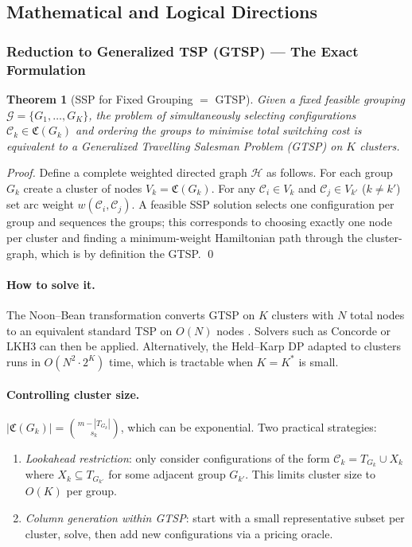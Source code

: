 \documentclass[11pt,a4paper]{article}
\theoremstyle{plain}
\newtheorem{theorem}{Theorem}[section]
\theoremstyle{definition}
\newcommand{\Cconf}{\mathfrak{C}}   %
\newcommand{\calG}{\mathcal{G}}     %
\newcommand{\Kstar}{K^{*}}          %
\newcommand{\sswitch}[2]{w(#1,#2)}  %
\begin{document}
\subsection{Mathematical and Logical Directions}

\subsubsection{Reduction to Generalized TSP (GTSP) --- The Exact Formulation}
\label{sec:GTSP}

\begin{thmbox}
\begin{theorem}[SSP for Fixed Grouping $=$ GTSP]
\label{thm:GTSP}
Given a fixed feasible grouping $\calG = \{G_1,\ldots,G_K\}$, the problem of
simultaneously selecting configurations $\mathcal{C}_k \in \Cconf(G_k)$ and
ordering the groups to minimise total switching cost is equivalent to a
Generalized Travelling Salesman Problem (GTSP) on $K$ clusters.
\end{theorem}
\end{thmbox}

\begin{proof}
Define a complete weighted directed graph $\mathcal{H}$ as follows.
For each group $G_k$ create a cluster of nodes $V_k = \Cconf(G_k)$.
For any $\mathcal{C}_i \in V_k$ and $\mathcal{C}_j \in V_{k'}$ ($k \ne k'$) set arc weight
$\sswitch{\mathcal{C}_i}{\mathcal{C}_j}$.
A feasible SSP solution selects one configuration per group and sequences the groups;
this corresponds to choosing exactly one node per cluster and finding a minimum-weight
Hamiltonian path through the cluster-graph, which is by definition the GTSP. \qed
\end{proof}

\paragraph{How to solve it.}
The Noon--Bean transformation converts GTSP on $K$ clusters with $N$ total nodes to
an equivalent standard TSP on $O(N)$ nodes \cite{NoonBean1993}.
Solvers such as Concorde or LKH3 can then be applied.
Alternatively, the Held--Karp DP adapted to clusters runs in $O(N^2 \cdot 2^K)$ time,
which is tractable when $K = \Kstar$ is small.

\paragraph{Controlling cluster size.}
$|\Cconf(G_k)| = \binom{m - |T_{G_k}|}{s_k}$, which can be exponential.
Two practical strategies:
\begin{enumerate}[label=(\roman*)]
  \item \emph{Lookahead restriction}: only consider configurations of the form
        $\mathcal{C}_k = T_{G_k} \cup X_k$ where $X_k \subseteq T_{G_{k'}}$ for
        some adjacent group $G_{k'}$. This limits cluster size to $O(K)$ per group.
  \item \emph{Column generation within GTSP}: start with a small representative subset
        per cluster, solve, then add new configurations via a pricing oracle.
\end{enumerate}
\end{document}
